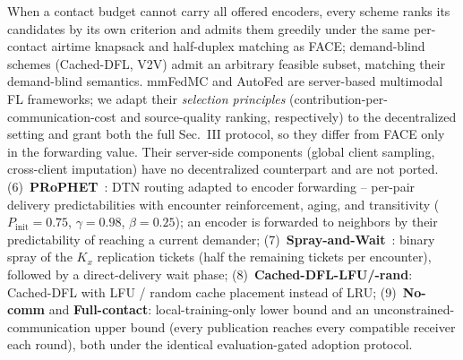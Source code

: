 When a contact budget cannot carry all offered encoders, every scheme
ranks its candidates by its own criterion and admits them greedily
under the same per-contact airtime knapsack and half-duplex matching as
FACE; demand-blind schemes (Cached-DFL, V2V) admit an arbitrary
feasible subset, matching their demand-blind semantics.
mmFedMC and AutoFed are server-based multimodal FL frameworks; we adapt
their \emph{selection principles} (contribution-per-communication-cost
and source-quality ranking, respectively) to the decentralized setting
and grant both the full Sec.~III protocol, so they differ from FACE
only in the forwarding value. Their server-side components (global
client sampling, cross-client imputation) have no decentralized
counterpart and are not ported.
(6)~\textbf{PRoPHET}~\cite{prophet}: DTN routing adapted to encoder
forwarding -- per-pair delivery predictabilities with encounter
reinforcement, aging, and transitivity
($P_{\mathrm{init}}{=}0.75$, $\gamma{=}0.98$, $\beta{=}0.25$); an
encoder is forwarded to neighbors by their predictability of reaching a
current demander;
(7)~\textbf{Spray-and-Wait}~\cite{spraywait}: binary spray of the $K_x$
replication tickets (half the remaining tickets per encounter),
followed by a direct-delivery wait phase;
(8)~\textbf{Cached-DFL-LFU/-rand}: Cached-DFL with LFU / random cache
placement instead of LRU;
(9)~\textbf{No-comm} and \textbf{Full-contact}: local-training-only
lower bound and an unconstrained-communication upper bound (every
publication reaches every compatible receiver each round), both under
the identical evaluation-gated adoption protocol.
